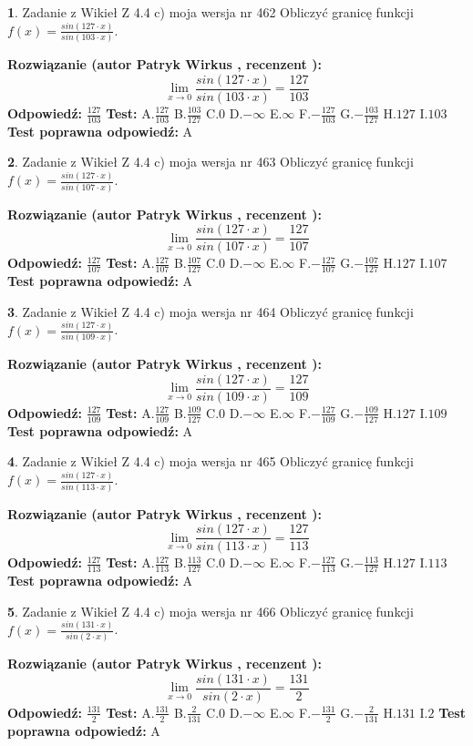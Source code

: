 \documentclass[12pt, a4paper]{article}
\theoremstyle{definition} %
\newtheorem{zad}{}
\newcommand{\zadStart}[1]{\begin{zad}#1\newline}
\newcommand{\zadStop}{\end{zad}}
\newcommand{\rozwStart}[2]{\noindent \textbf{Rozwiązanie (autor #1 , recenzent #2): }\newline}
\newcommand{\rozwStop}{\newline}
\newcommand{\odpStart}{\noindent \textbf{Odpowiedź:}\newline}
\newcommand{\odpStop}{\newline}
\newcommand{\testStart}{\noindent \textbf{Test:}\newline}
\newcommand{\testStop}{\newline}
\newcommand{\kluczStart}{\noindent \textbf{Test poprawna odpowiedź:}\newline}
\newcommand{\kluczStop}{\newline}
\begin{document}
\zadStart{Zadanie z Wikieł Z 4.4 c) moja wersja nr 462}
Obliczyć granicę funkcji $f(x)=\frac{sin(127\cdot x)}{sin(103\cdot x)}$.
\zadStop
\rozwStart{Patryk Wirkus}{}
$$\lim\limits_{x\to 0}\frac{sin(127\cdot x)}{sin(103\cdot x)}=
\frac{127}{103}$$
\rozwStop
\odpStart
$\frac{127}{103}$
\odpStop
\testStart
A.$\frac{127}{103}$
B.$\frac{103}{127}$
C.$0$
D.$-\infty$
E.$\infty$
F.$-\frac{127}{103}$
G.$-\frac{103}{127}$
H.$127$
I.$103$
\testStop
\kluczStart
A
\kluczStop



\zadStart{Zadanie z Wikieł Z 4.4 c) moja wersja nr 463}
Obliczyć granicę funkcji $f(x)=\frac{sin(127\cdot x)}{sin(107\cdot x)}$.
\zadStop
\rozwStart{Patryk Wirkus}{}
$$\lim\limits_{x\to 0}\frac{sin(127\cdot x)}{sin(107\cdot x)}=
\frac{127}{107}$$
\rozwStop
\odpStart
$\frac{127}{107}$
\odpStop
\testStart
A.$\frac{127}{107}$
B.$\frac{107}{127}$
C.$0$
D.$-\infty$
E.$\infty$
F.$-\frac{127}{107}$
G.$-\frac{107}{127}$
H.$127$
I.$107$
\testStop
\kluczStart
A
\kluczStop



\zadStart{Zadanie z Wikieł Z 4.4 c) moja wersja nr 464}
Obliczyć granicę funkcji $f(x)=\frac{sin(127\cdot x)}{sin(109\cdot x)}$.
\zadStop
\rozwStart{Patryk Wirkus}{}
$$\lim\limits_{x\to 0}\frac{sin(127\cdot x)}{sin(109\cdot x)}=
\frac{127}{109}$$
\rozwStop
\odpStart
$\frac{127}{109}$
\odpStop
\testStart
A.$\frac{127}{109}$
B.$\frac{109}{127}$
C.$0$
D.$-\infty$
E.$\infty$
F.$-\frac{127}{109}$
G.$-\frac{109}{127}$
H.$127$
I.$109$
\testStop
\kluczStart
A
\kluczStop



\zadStart{Zadanie z Wikieł Z 4.4 c) moja wersja nr 465}
Obliczyć granicę funkcji $f(x)=\frac{sin(127\cdot x)}{sin(113\cdot x)}$.
\zadStop
\rozwStart{Patryk Wirkus}{}
$$\lim\limits_{x\to 0}\frac{sin(127\cdot x)}{sin(113\cdot x)}=
\frac{127}{113}$$
\rozwStop
\odpStart
$\frac{127}{113}$
\odpStop
\testStart
A.$\frac{127}{113}$
B.$\frac{113}{127}$
C.$0$
D.$-\infty$
E.$\infty$
F.$-\frac{127}{113}$
G.$-\frac{113}{127}$
H.$127$
I.$113$
\testStop
\kluczStart
A
\kluczStop



\zadStart{Zadanie z Wikieł Z 4.4 c) moja wersja nr 466}
Obliczyć granicę funkcji $f(x)=\frac{sin(131\cdot x)}{sin(2\cdot x)}$.
\zadStop
\rozwStart{Patryk Wirkus}{}
$$\lim\limits_{x\to 0}\frac{sin(131\cdot x)}{sin(2\cdot x)}=
\frac{131}{2}$$
\rozwStop
\odpStart
$\frac{131}{2}$
\odpStop
\testStart
A.$\frac{131}{2}$
B.$\frac{2}{131}$
C.$0$
D.$-\infty$
E.$\infty$
F.$-\frac{131}{2}$
G.$-\frac{2}{131}$
H.$131$
I.$2$
\testStop
\kluczStart
A
\kluczStop
\end{document}
